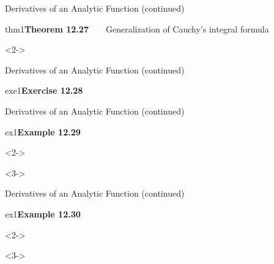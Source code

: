 \def\EMtitlesize{26}\def\EMtitleskip{31}
\begin{frame}{Derivatives of an Analytic Function (continued)}
\begin{EMbox}{thm}{1}{\textbf{Theorem 12.27}\ \ \lr{|}\ \ Generalization of Cauchy's integral formula}
\begin{uncoverenv}<2->
\vspace{3bp}
\end{uncoverenv}
\end{EMbox}
\end{frame}

\def\EMtitlesize{26}\def\EMtitleskip{31}
\begin{frame}{Derivatives of an Analytic Function (continued)}
\begin{EMbox}{exe}{1}{\textbf{Exercise 12.28}}
\end{EMbox}
\end{frame}

\def\EMtitlesize{26}\def\EMtitleskip{31}
\begin{frame}{Derivatives of an Analytic Function (continued)}
\begin{EMbox}{ex}{1}{\textbf{Example 12.29}}
\vspace{3bp}
\EMgap
\begin{uncoverenv}<2->
\end{uncoverenv}
\EMgap
\begin{uncoverenv}<3->
\end{uncoverenv}
\end{EMbox}
\end{frame}

\def\EMtitlesize{26}\def\EMtitleskip{31}
\begin{frame}{Derivatives of an Analytic Function (continued)}
\begin{EMbox}{ex}{1}{\textbf{Example 12.30}}
\vspace{3bp}
\EMgap
\begin{uncoverenv}<2->
\end{uncoverenv}
\EMgap
\begin{uncoverenv}<3->
\end{uncoverenv}
\end{EMbox}
\end{frame}

